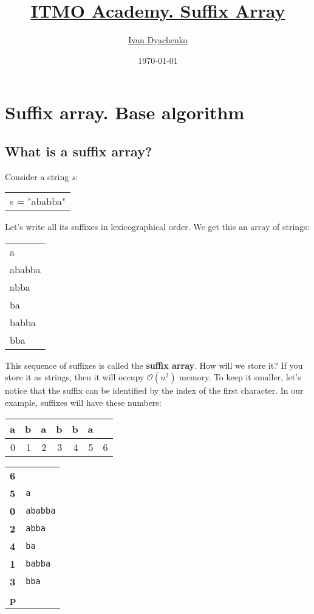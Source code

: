 \documentclass[11pt]{article}
\author{\href{http://ivandyachenko.io/}{Ivan Dyachenko}}
\date{\today}
\title{\href{https://codeforces.com/edu/course/2/lesson/2}{ITMO Academy. Suffix Array}}
\begin{document}
\maketitle
\tableofcontents


\section{Suffix array. Base algorithm}
\label{sec:org9db0cea}

\subsection{What is a suffix array?}
\label{sec:org9aa859c}
Consider a string \(s\):
\begin{center}
\begin{tabular}{l}
s = "ababba"\\
\end{tabular}
\end{center}

Let's write all its suffixes in lexicographical order. We get this an array of strings:
\begin{center}
\begin{tabular}{l}
a\\
ababba\\
abba\\
ba\\
babba\\
bba\\
\end{tabular}
\end{center}

This sequence of suffixes is called the \textbf{suffix array}. How will we store it? If you store it as
strings, then it will occupy \(\mathcal{O}(n^2)\) memory. To keep it smaller, let's notice that the
suffix can be identified by the index of the first character. In our example, suffixes will have these
numbers:
\begin{center}
\begin{tabular}{rrrrrrr}
\textbf{a} & \textbf{b} & \textbf{a} & \textbf{b} & \textbf{b} & \textbf{a} & \\
\hline
0 & 1 & 2 & 3 & 4 & 5 & 6\\
\end{tabular}
\end{center}

\begin{center}
\begin{tabular}{ll}
\textbf{6} & \\
\textbf{5} & \texttt{a}\\
\textbf{0} & \texttt{ababba}\\
\textbf{2} & \texttt{abba}\\
\textbf{4} & \texttt{ba}\\
\textbf{1} & \texttt{babba}\\
\textbf{3} & \texttt{bba}\\
\textbf{p} & \\
\end{tabular}
\end{center}
\end{document}
